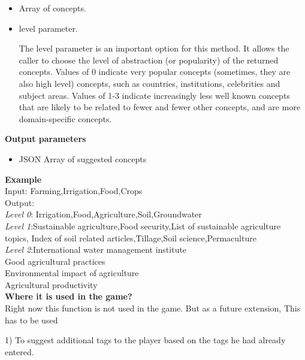 \documentclass[12pt]{article}
\begin{document}
\begin{enumerate}
\begin{itemize}
\item Array of concepts. 
\item  level parameter.

The level parameter is an important option for this method. It allows the caller to choose the level of abstraction (or popularity) of the returned concepts. Values of 0 indicate very popular concepts (sometimes, they are also high level) concepts, such as countries, institutions, celebrities and subject areas. Values of 1-3 indicate increasingly less well known concepts that are likely to be related to fewer and fewer other concepts, and are more domain-specific concepts.

\end{itemize}
\textbf{Output parameters}
\begin{itemize}


\item JSON Array of suggested concepts

    \end{itemize}
    
  \textbf{Example}\\


Input: Farming,Irrigation,Food,Crops\\

Output:\\

 \emph{Level 0}: Irrigation,Food,Agriculture,Soil,Groundwater\\
 \emph{Level 1}:Sustainable agriculture,Food security,List of sustainable agriculture topics,
Index of soil related articles,Tillage,Soil science,Permaculture\\
\emph{Level 2}:International water management institute\\
Good agricultural practices\\
Environmental impact of agriculture\\
Agricultural productivity\\








 

  

\textbf{Where it is used in the game?}\\
Right now this function is not used in the game.  But as a future extension, This has to be used 

1) To suggest additional tags to the player based on the tags he had already entered.
\end{enumerate}
\end{document}

